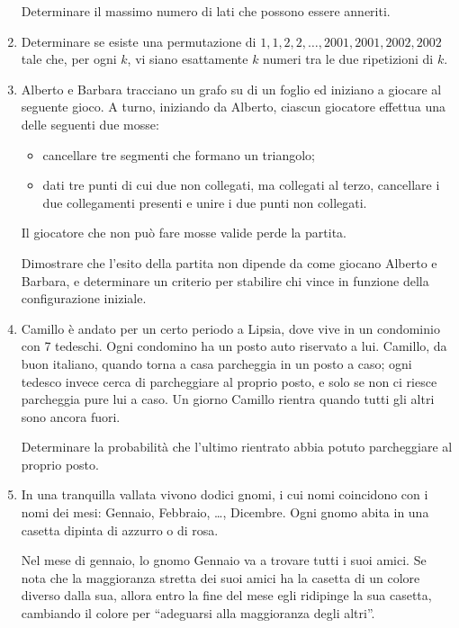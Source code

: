 \documentclass[a4paper,10pt]{article}
\begin{document}
\begin{enumerate}
	Determinare il massimo numero di lati che possono essere anneriti.

	\item  Determinare se esiste una permutazione di
	$1,1,2,2,\ldots,2001,2001,2002,2002$ tale che, per ogni $k$, vi
	siano esattamente $k$ numeri tra le due ripetizioni di $k$.

	\item  Alberto e Barbara tracciano un grafo su di un foglio ed
	iniziano a giocare al seguente gioco. A turno, iniziando da Alberto,
	ciascun giocatore effettua una delle seguenti due mosse:
	\begin{itemize}
		\item  cancellare tre segmenti che formano un triangolo;

		\item  dati tre punti di cui due non collegati, ma collegati al
		terzo, cancellare i due collegamenti presenti e unire i due punti
		non collegati.
	\end{itemize}

	Il giocatore che non pu\`{o} fare mosse valide perde la partita.

	Dimostrare che l'esito della partita non dipende da come giocano
	Alberto e Barbara, e determinare un criterio per stabilire chi
	vince in funzione della configurazione iniziale.

	\item  Camillo \`{e} andato per un certo periodo a Lipsia, dove vive
	in un condominio con 7 tedeschi. Ogni condomino ha un posto auto
	riservato a lui. Camillo, da buon ita\-lia\-no, quando torna a casa
	parcheggia in un posto a caso; ogni tedesco invece cerca di
	parcheggiare al proprio posto, e solo se non ci riesce parcheggia
	pure lui a caso. Un giorno Camillo rientra quando tutti gli altri
	sono ancora fuori.

	Determinare la probabilit\`{a} che l'ultimo rientrato abbia potuto
	parcheggiare al proprio posto.

	\item In una tranquilla vallata vivono dodici gnomi, i cui nomi
	coincidono con i nomi dei mesi: Gennaio, Febbraio, \ldots,
	Dicembre.  Ogni gnomo abita in una casetta dipinta di azzurro o di
	rosa.

	Nel mese di gennaio, lo gnomo Gennaio va a trovare tutti i suoi
	amici.  Se nota che la maggioranza stretta dei suoi amici ha la
	casetta di un colore diverso dalla sua, allora entro la fine del
	mese egli ridipinge la sua casetta, cambiando il colore per
	``adeguarsi alla maggioranza degli altri''.


\end{enumerate}
\end{document}
